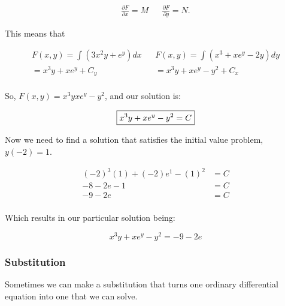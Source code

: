 \begin{problem}
    \begin{align*}
      \frac{\partial F}{\partial x}=M && \frac{\partial F}{\partial y}=N.
      \end{align*}

      This means that 

      \begin{align*}
        F(x,y)=\int(3x^2y+e^y)dx && F(x,y)=\int(x^3+xe^y-2y)dy\\
        =x^3y+xe^y+C_y && =x^3y+xe^y-y^2+C_x\\
      \end{align*}

      So, $F(x,y)=x^3yxe^y-y^2$, and our solution is:

      \[
        \boxed{x^3y+xe^y-y^2=C}\\
      \]

      Now we need to find a solution that satisfies the initial value problem, $y(-2)=1$.
      
      \begin{align*}
        (-2)^3(1)+(-2)e^1-(1)^2&=C\\
        -8-2e-1&=C\\
        -9-2e&=C\\
      \end{align*}

      Which results in our particular solution being:

      \[
        \boxed{x^3y+xe^y-y^2=-9-2e}
      \]
    \end{problem}

  \subsubsection{Substitution}
    Sometimes we can make a substitution that turns one ordinary differential equation into one that we can solve.
    

